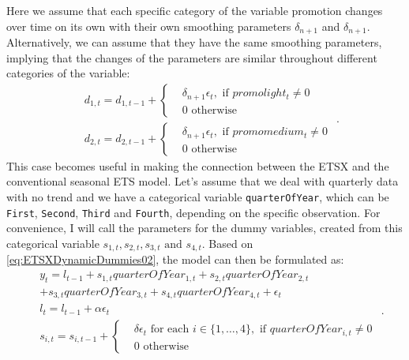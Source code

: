 \documentclass[
]{book}
\theoremstyle{definition}
\theoremstyle{definition}
\theoremstyle{definition}
\theoremstyle{definition}
\theoremstyle{remark}
\begin{document}
Here we assume that each specific category of the variable promotion changes over time on its own with their own smoothing parameters \(\delta_{n+1}\) and \(\delta_{n+1}\). Alternatively, we can assume that they have the same smoothing parameters, implying that the changes of the parameters are similar throughout different categories of the variable:
\begin{equation}
  \begin{aligned}
    & d_{1,t} = d_{1,t-1} + \left \lbrace \begin{aligned}
                  &\delta_{n+1} \epsilon_t, \text{ if } promolight_t\neq 0 \\
                  &0 \text{ otherwise }
            \end{aligned} \right. \\
    & d_{2,t} = d_{2,t-1} + \left \lbrace \begin{aligned}
                  &\delta_{n+1} \epsilon_t, \text{ if } promomedium_t\neq 0 \\
                  &0 \text{ otherwise }
            \end{aligned} \right.
  \end{aligned} .
  \label{eq:ETSXDynamicDummies02}
\end{equation}
This case becomes useful in making the connection between the ETSX and the conventional seasonal ETS model. Let's assume that we deal with quarterly data with no trend and we have a categorical variable \texttt{quarterOfYear}, which can be \texttt{First}, \texttt{Second}, \texttt{Third} and \texttt{Fourth}, depending on the specific observation. For convenience, I will call the parameters for the dummy variables, created from this categorical variable \(s_{1,t}, s_{2,t}, s_{3,t} \text{ and } s_{4,t}\). Based on \eqref{eq:ETSXDynamicDummies02}, the model can then be formulated as:
\begin{equation}
  \begin{aligned}
    & y_{t} = l_{t-1} + s_{1,t} quarterOfYear_{1,t} + s_{2,t} quarterOfYear_{2,t} \\
            & + s_{3,t} quarterOfYear_{3,t} + s_{4,t} quarterOfYear_{4,t} + \epsilon_t \\
    & l_t = l_{t-1} + \alpha \epsilon_t \\
    & s_{i,t} = s_{i,t-1} + \left \lbrace \begin{aligned}
                  &\delta \epsilon_t \text{ for each } i \in \{1, \dots, 4\}, \text{ if } quarterOfYear_{i,t}\neq 0 \\
                  &0 \text{ otherwise }
            \end{aligned} \right.
  \end{aligned} .
  \label{eq:ETSXDynamicDummiesSeasonal}
\end{equation}
\end{document}
